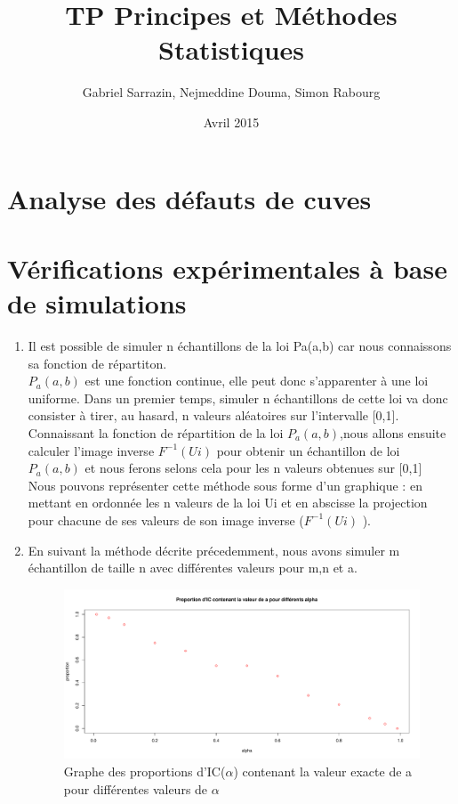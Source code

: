 \documentclass[12pt]{article}
\title{TP Principes et M\'{e}thodes Statistiques}
\author{Gabriel Sarrazin, Nejmeddine Douma, Simon Rabourg}
\date{Avril 2015}
\begin{document}

\maketitle

\section{Analyse des d\'{e}fauts de cuves}


\section{V\'{e}rifications exp\'{e}rimentales \`{a} base de simulations}


\begin{enumerate}
\item Il est possible de simuler n \'{e}chantillons de la loi Pa(a,b) car nous connaissons sa fonction de r\'{e}partiton. 
\\
$P_a(a,b)$ est une fonction continue, elle peut donc s'apparenter \`{a} une loi uniforme.  Dans un premier temps, simuler n \'{e}chantillons de cette loi va donc consister  \`{a} tirer, au hasard, n valeurs al\'{e}atoires sur l'intervalle [0,1]. Connaissant la fonction de r\'{e}partition de la loi  $P_a(a,b)$,nous allons ensuite calculer l'image inverse $ F^{-1}(Ui)$ pour obtenir un \'{e}chantillon de loi $P_a(a,b)$ et nous ferons selons cela pour les n valeurs obtenues sur [0,1]
\\
Nous pouvons repr\'{e}senter cette m\'{e}thode sous forme d'un graphique : en mettant en ordonn\'{e}e les n valeurs de la loi Ui et en abscisse la projection pour chacune de ses valeurs de son image inverse ($F^{-1}(Ui)$ ).
\\

\item
 En suivant la m\'{e}thode d\'{e}crite pr\'{e}cedemment, nous  avons simuler m \'{e}chantillon de taille n avec diff\'{e}rentes valeurs pour m,n et a. 


\begin{figure}[h]
\label{graph1}
\centering
\includegraphics[width=1.0\textwidth]{figures/Graph_P2Q2.pdf}
\caption{Graphe des proportions d'IC($\alpha$) contenant la valeur exacte de a pour diff\'{e}rentes valeurs de $\alpha$}
\end{figure}



\end{enumerate}
\end{document}
